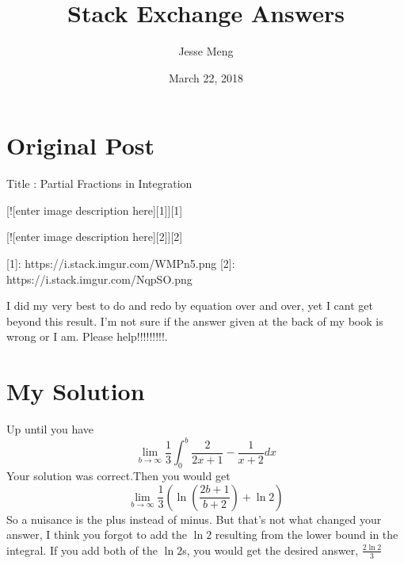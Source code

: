 \documentclass{article}
\title{Stack Exchange Answers}
\author{Jesse Meng }
\date{March 22, 2018}
\begin{document}
\maketitle

\section{Original Post}
Title : Partial Fractions in Integration

[![enter image description here][1]][1]


[![enter image description here][2]][2]


  [1]: https://i.stack.imgur.com/WMPn5.png
  [2]: https://i.stack.imgur.com/NqpSO.png

I did my very best to do and redo by equation over and over, yet I cant get beyond this result. I'm not sure if the answer given at the back of my book is wrong or I am. Please help!!!!!!!!!.
\section{My Solution}
Up until you have $$\lim_{b\to\infty}\frac{1}{3}\int_{0}^{b}\frac{2}{2x+1}-\frac{1}{x+2}dx$$Your solution was correct.Then you would get$$\lim_{b\to\infty}\frac{1}{3}(\ln(\frac{2b+1}{b+2})+\ln2)$$ So a nuisance is the plus instead of minus. But that's not what changed your answer, I think you  forgot to add the $\ln2$ resulting from the lower bound in the integral. If you add both of the $\ln2$s, you would get the desired answer, $\frac{2\ln2}{3}$
\end{document}
